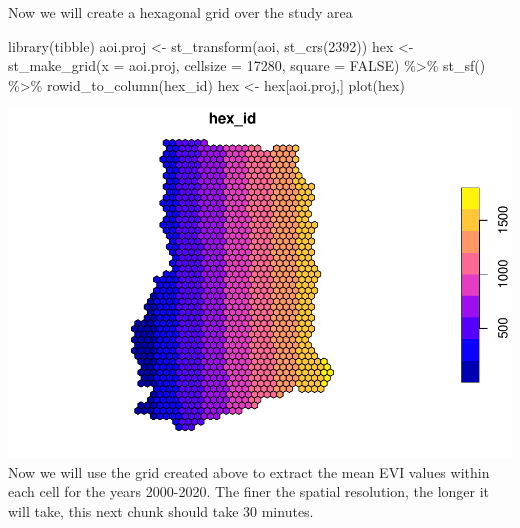 \documentclass[10pt]{report}
\newenvironment{Shaded}{\begin{snugshade}}{\end{snugshade}}
\newcommand{\AttributeTok}[1]{\textcolor[rgb]{0.77,0.63,0.00}{#1}}
\newcommand{\ConstantTok}[1]{\textcolor[rgb]{0.00,0.00,0.00}{#1}}
\newcommand{\DecValTok}[1]{\textcolor[rgb]{0.00,0.00,0.81}{#1}}
\newcommand{\FunctionTok}[1]{\textcolor[rgb]{0.00,0.00,0.00}{#1}}
\newcommand{\NormalTok}[1]{#1}
\newcommand{\OtherTok}[1]{\textcolor[rgb]{0.56,0.35,0.01}{#1}}
\newcommand{\SpecialCharTok}[1]{\textcolor[rgb]{0.00,0.00,0.00}{#1}}
\newcommand{\StringTok}[1]{\textcolor[rgb]{0.31,0.60,0.02}{#1}}
\begin{document}
Now we will create a hexagonal grid over the study area

\begin{Shaded}
\begin{Highlighting}[]
\FunctionTok{library}\NormalTok{(tibble)}
\NormalTok{aoi.proj }\OtherTok{\textless{}{-}} \FunctionTok{st\_transform}\NormalTok{(aoi, }\FunctionTok{st\_crs}\NormalTok{(}\DecValTok{2392}\NormalTok{))}
\NormalTok{hex }\OtherTok{\textless{}{-}} \FunctionTok{st\_make\_grid}\NormalTok{(}\AttributeTok{x =}\NormalTok{ aoi.proj, }\AttributeTok{cellsize =} \DecValTok{17280}\NormalTok{, }\AttributeTok{square =} \ConstantTok{FALSE}\NormalTok{) }\SpecialCharTok{\%\textgreater{}\%}
\FunctionTok{st\_sf}\NormalTok{() }\SpecialCharTok{\%\textgreater{}\%}
\FunctionTok{rowid\_to\_column}\NormalTok{(}\StringTok{\textquotesingle{}hex\_id\textquotesingle{}}\NormalTok{)}
\NormalTok{hex }\OtherTok{\textless{}{-}}\NormalTok{ hex[aoi.proj,]}
\FunctionTok{plot}\NormalTok{(hex)}
\end{Highlighting}
\end{Shaded}

\includegraphics{unnamed-chunk-7-1.pdf}
 Now we will use the grid created above to extract the mean EVI values within
each cell for the years 2000-2020. The finer the spatial resolution, the
longer it will take, this next chunk should take 30 minutes.
\end{document}
